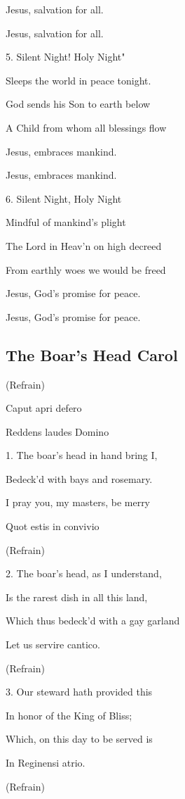 \begin{description}[nosep,leftmargin=\parindent,labelsep=0pt]
\item Jesus, salvation for all. 
\item Jesus, salvation for all. 
\vspace{1.5ex}
\item 5. Silent Night! Holy Night" 
\item Sleeps the world in peace tonight. 
\item God sends his Son to earth below 
\item A Child from whom all blessings flow 
\item Jesus, embraces mankind. 
\item Jesus, embraces mankind. 
\vspace{1.5ex}
\item 6. Silent Night, Holy Night 
\item Mindful of mankind's plight 
\item The Lord in Heav'n on high decreed 
\item From earthly woes we would be freed 
\item Jesus, God's promise for peace. 
\item Jesus, God's promise for peace. 
\end{description}
\subsection{The Boar's Head Carol}\label{boars_head}
\begin{description}[nosep,leftmargin=\parindent,labelsep=0pt]
\item (Refrain) 
\item Caput apri defero 
\item Reddens laudes Domino 
\vspace{1.5ex}
\item 1. The boar’s head in hand bring I, 
\item Bedeck'd with bays and rosemary. 
\item I pray you, my masters, be merry 
\item Quot estis in convivio 
\item (Refrain) 
\vspace{1.5ex}
\item 2. The boar's head, as I understand, 
\item Is the rarest dish in all this land, 
\item Which thus bedeck'd with a gay garland 
\item Let us servire cantico. 
\item (Refrain) 
\vspace{1.5ex}
\item 3. Our steward hath provided this 
\item In honor of the King of Bliss; 
\item Which, on this day to be served is 
\item In Reginensi atrio. 
\item (Refrain) 
\end{description}
